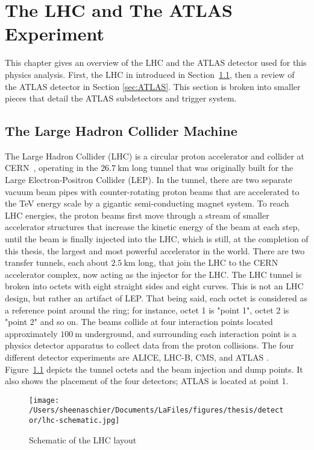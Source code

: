 \chapter{The LHC and The ATLAS Experiment}
\label{ch:detector}
This chapter gives an overview of the LHC and the ATLAS detector used for this physics analysis.  First, the LHC in introduced in Section~\ref{sec:LHC}, then a review of the ATLAS detector in Section \ref{sec:ATLAS}.  This section is broken into smaller pieces that detail the ATLAS subdetectors and trigger system. %
\section{The Large Hadron Collider Machine}
\label{sec:LHC}

The Large Hadron Collider (LHC) is a circular proton accelerator and collider at CERN~\cite{Evans:2008zzb}, operating in the $26.7~\mathrm{km}$ long tunnel that was originally built for the Large Electron-Positron Collider (LEP).  In the tunnel, there are two separate vacuum beam pipes with counter-rotating proton beams that are accelerated to the TeV energy scale by a gigantic semi-conducting magnet system.  To reach LHC energies, the proton beams first move through a stream of smaller accelerator structures that increase the kinetic energy of the beam at each step, until the beam is finally injected into the LHC, which is still, at the completion of this thesis, the largest and most powerful accelerator in the world.  There are two transfer tunnels, each about $2.5~\mathrm{km}$ long, that join the LHC to the CERN accelerator complex, now acting as the injector for the LHC.  The LHC tunnel is broken into octets with eight straight sides and eight curves.  This is not an LHC design, but rather an artifact of LEP.   That being said, each octet is considered as a reference point around the ring; for instance, octet 1 is "point 1", octet 2 is "point 2" and so on.  The beams collide at four interaction points located approximately $100~\mathrm{m}$ underground, and surrounding each interaction point is a physics detector apparatus to collect data from the proton collisions.  The four different detector experiments are ALICE, LHC-B, CMS, and ATLAS \cite{Jean-Luc:841555}.  Figure~\ref{fig:lhc} depicts the tunnel octets and the beam injection and dump points.  It also shows the placement of the four detectors; ATLAS is located at point 1.
  \begin{figure}[tbp]
    \centering
 \texttt{[image: /Users/sheenaschier/Documents/LaFiles/figures/thesis/detector/lhc-schematic.jpg]}
    \caption{Schematic of the LHC layout}
   \label{fig:lhc}
 \end{figure}
 
